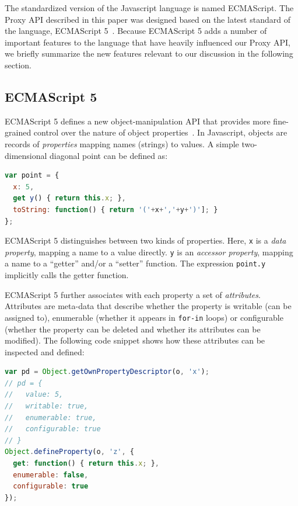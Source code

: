 \documentclass{sig-alternate}
\begin{document}
The standardized version of the Javascript language is named ECMAScript. The Proxy API described in this paper was designed based on the latest standard of the language, ECMAScript 5~\cite{ECMA262}. Because ECMAScript 5 adds a number of important features to the language that have heavily influenced our Proxy API, we briefly summarize the new features relevant to our discussion in the following section.

\subsection{ECMAScript 5}
\label{sub:es5}

ECMAScript 5 defines a new object-manipulation API that provides more fine-grained control over the nature of object properties~\cite{ECMA262}. In Javascript, objects are records of \emph{properties} mapping names (strings) to values. A simple two-dimensional diagonal point can be defined as:

\begin{lstlisting}[language=javascript]
var point = {
  x: 5,
  get y() { return this.x; },
  toString: function() { return '('+x+','+y+')']; }
};
\end{lstlisting}

ECMAScript 5 distinguishes between two kinds of properties. Here, \texttt{x} is a \emph{data property}, mapping a name to a value directly. \texttt{y} is an \emph{accessor property}, mapping a name to a ``getter'' and/or a ``setter'' function. The expression \texttt{point.y} implicitly calls the getter function.

ECMAScript 5 further associates with each property a set of \emph{attributes}. Attributes are meta-data that describe whether the property is writable (can be assigned to), enumerable (whether it appears in \texttt{for-in} loops) or configurable (whether the property can be deleted and whether its attributes can be modified). The following code snippet shows how these attributes can be inspected and defined:

\begin{lstlisting}[language=javascript]
var pd = Object.getOwnPropertyDescriptor(o, 'x');
// pd = {
//   value: 5,
//   writable: true,
//   enumerable: true,
//   configurable: true 
// }
Object.defineProperty(o, 'z', {
  get: function() { return this.x; },
  enumerable: false,
  configurable: true
});
\end{lstlisting}
\end{document}

